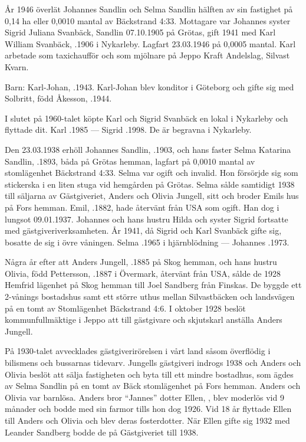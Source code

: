 År 1946 överlät Johannes Sandlin och Selma Sandlin hälften av sin	fastighet på 0,14 ha eller 0,0010 mantal av Bäckstrand 4:33. Mottagare	var Johannes syster Sigrid Juliana Svanbäck, \textborn Sandlin	07.10.1905 på Grötas, gift 1941 med Karl William Svanbäck, .1906 i Nykarleby. Lagfart 23.03.1946 på 0,0005 mantal. Karl arbetade som taxichaufför och som mjölnare på Jeppo Kraft Andelslag, Silvast Kvarn.

Barn:	Karl-Johan,	.1943.	Karl-Johan blev konditor i Göteborg och gifte sig med Solbritt, född	Åkesson, .1944.

I slutet på 1960-talet köpte Karl och Sigrid Svanbäck en lokal i Nykarleby och flyttade dit.
Karl .1985  ---  Sigrid .1998. De är	begravna i Nykarleby.


Den 23.03.1938 erhöll Johannes Sandlin, .1903, och hans faster Selma Katarina Sandlin, .1893, båda på Grötas hemman, lagfart på 0,0010 mantal av stomlägenhet Bäckstrand 4:33. Selma var ogift och invalid. Hon försörjde sig som stickerska i en	liten stuga vid hemgården på Grötas. Selma sålde samtidigt 1938	till säljarna av Gästgiveriet, Anders och Olivia Jungell, sitt och broder Emils hus på Fors hemman. Emil, .1882, hade återvänt från USA som ogift. Han dog i lungsot 09.01.1937. Johannes och hans hustru Hilda och syster Sigrid fortsatte med gästgiveriverksamheten. År 1941, då Sigrid och Karl Svanbäck gifte sig, bosatte de sig i övre våningen.
Selma .1965 i hjärnblödning  ---  Johannes .1973.


Några år efter att Anders Jungell, .1885 på Skog hemman,	och hans hustru Olivia, född Pettersson, .1887 i Övermark, återvänt från USA, sålde de 1928 Hemfrid lägenhet på Skog hemman till Joel Sandberg från Finskas. De byggde ett 2-vånings bostadshus samt ett	större uthus mellan Silvastbäcken och landsvägen på en tomt av Stomlägenhet Bäckstrand 4:6. I oktober 1928 beslöt kommunfullmäktige i Jeppo att till gästgivare och skjutskarl anställa Anders Jungell.

På 1930-talet avvecklades gästgiverirörelsen i vårt land såsom överflödig	i bilismens och bussarnas tidevarv. Jungells gästgiveri indrogs 1938 och	Anders och Olivia beslöt att sälja fastigheten och byta till ett mindre	bostadhus, som ägdes av Selma Sandlin på en tomt av Bäck stomlägenhet på Fors hemman. Anders och Olivia var barnlösa. Anders bror ``Jannes'' 	dotter Ellen, , blev moderlös vid 9 månader och bodde med sin farmor tills hon dog 1926. Vid 18 år flyttade Ellen till Anders och	Olivia och blev deras fosterdotter. När Ellen gifte sig 1932 med Leander Sandberg bodde de på Gästgiveriet till 1938.

